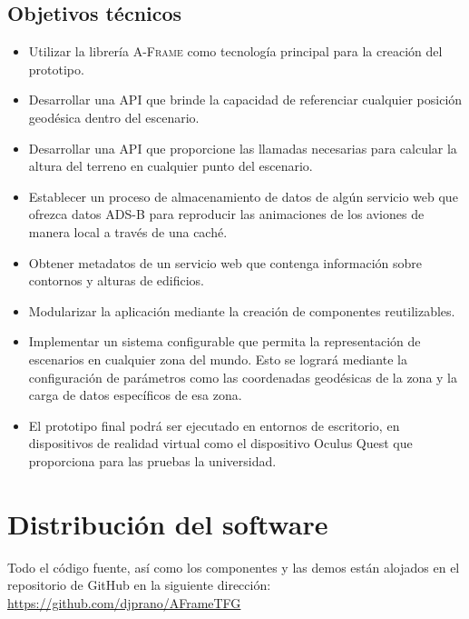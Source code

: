 \documentclass[a4paper, 11pt]{book}
\begin{document}
\subsection{Objetivos técnicos}
\begin{itemize}
	\item Utilizar la librería \textsc{A-Frame} como tecnología principal para la creación del prototipo.
	\item Desarrollar una \gls{API} que brinde la capacidad de referenciar cualquier posición geodésica dentro del escenario.
	\item Desarrollar una \gls{API} que proporcione las llamadas necesarias para calcular la altura del terreno en cualquier punto del escenario.
	\item Establecer un proceso de almacenamiento de datos de algún servicio web que ofrezca datos \textsc{ADS-B} para reproducir las animaciones de los aviones de manera local a través de una caché.
	\item Obtener metadatos de un servicio web que contenga información sobre contornos y alturas de edificios.
	\item Modularizar la aplicación mediante la creación de componentes reutilizables.
	\item Implementar un sistema configurable que permita la representación de escenarios en cualquier zona del mundo. Esto se logrará mediante la configuración de parámetros como las coordenadas geodésicas de la zona y la carga de datos específicos de esa zona.
	\item El prototipo final podrá ser ejecutado en entornos de escritorio, en dispositivos de realidad virtual como el dispositivo Oculus Quest que proporciona para las pruebas la universidad. 
\end{itemize}
\section{Distribución del software}
\label{sec:planificacion-temporal}
Todo el código fuente, así como los componentes y las demos están alojados en el repositorio de GitHub en la siguiente dirección: \url{https://github.com/djprano/AFrameTFG}
\end{document}
